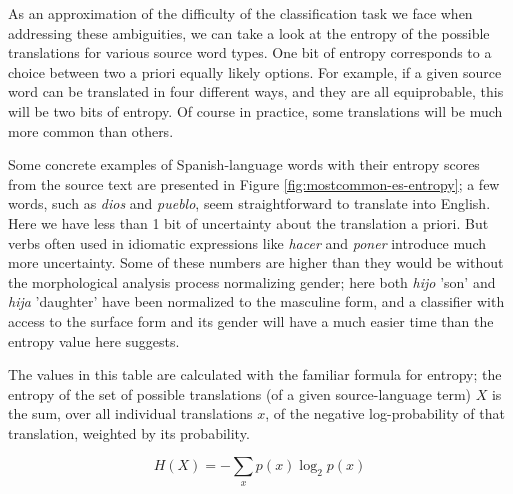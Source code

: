 As an approximation of the difficulty of the classification task we face when
addressing these ambiguities, we can take a look at the entropy of the possible
translations for various source word types.
One bit of entropy corresponds to a choice between two a priori equally likely
options. For example, if a given source word can be translated in four
different ways, and they are all equiprobable, this will be two bits of entropy.
Of course in practice, some translations will be much more common than others.

Some concrete examples of Spanish-language words with their entropy scores from
the source text are presented in Figure \ref{fig:mostcommon-es-entropy};
a few words, such as \emph{dios} and \emph{pueblo}, seem straightforward to
translate into English. Here we have less than 1 bit of uncertainty about the
translation a priori. But verbs often used in idiomatic expressions like
\emph{hacer} and \emph{poner} introduce much more uncertainty. Some of these
numbers are higher than they would be without the morphological
analysis process normalizing gender; here both \emph{hijo} 'son' and
\emph{hija} 'daughter' have been normalized to the masculine form, and a
classifier with access to the surface form and its gender will have a much
easier time than the entropy value here suggests.

The values in this table are calculated with the familiar formula for entropy;
the entropy of the set of possible translations (of a given source-language
term) $X$ is the sum, over all individual translations $x$, of the negative
log-probability of that translation, weighted by its probability.

$$
  H(X) = -\displaystyle\sum_{x} p(x)\log_{2}{p(x)}
$$

